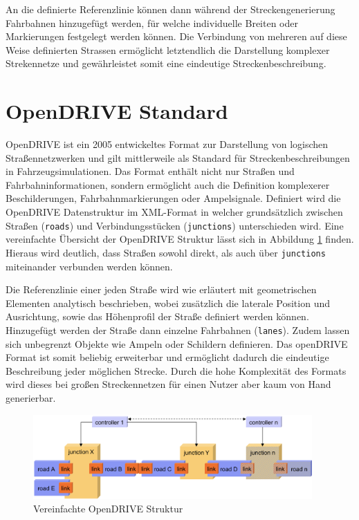 An die definierte Referenzlinie können dann während der Streckengenerierung Fahrbahnen hinzugefügt werden, für welche individuelle Breiten oder Markierungen festgelegt werden können. Die Verbindung von mehreren auf diese Weise definierten Strassen ermöglicht letztendlich die Darstellung komplexer Strekennetze und gewährleistet somit eine eindeutige Streckenbeschreibung. 

\section{OpenDRIVE Standard}

OpenDRIVE ist ein 2005 entwickeltes Format zur Darstellung von logischen Straßennetzwerken und gilt mittlerweile als Standard für Streckenbeschreibungen in Fahrzeugsimulationen. Das Format enthält nicht nur Straßen und Fahrbahninformationen, sondern ermöglicht auch die Definition komplexerer Beschilderungen, Fahrbahnmarkierungen oder Ampelsignale. \cite{OpenDRIVE.2019} Definiert wird die OpenDRIVE Datenstruktur im XML-Format in welcher grundsätzlich zwischen Straßen (\texttt{roads}) und Verbindungsstücken (\texttt{junctions}) unterschieden wird. Eine vereinfachte Übersicht der OpenDRIVE Struktur lässt sich in Abbildung \ref{abb3} finden. Hieraus wird deutlich, dass Straßen sowohl direkt, als auch über \texttt{junctions} miteinander verbunden werden können. 

Die Referenzlinie einer jeden Straße wird wie erläutert mit geometrischen Elementen analytisch beschrieben, wobei zusätzlich die laterale Position und Ausrichtung, sowie das Höhenprofil der Straße definiert werden können. Hinzugefügt werden der Straße dann einzelne Fahrbahnen (\texttt{lanes}). Zudem lassen sich unbegrenzt Objekte wie Ampeln oder Schildern definieren. \cite{OpenDRIVEDoku.2019} Das openDRIVE Format ist somit beliebig erweiterbar und ermöglicht dadurch die eindeutige Beschreibung jeder möglichen Strecke. Durch die hohe Komplexität des Formats wird dieses bei großen Streckennetzen für einen Nutzer aber kaum von Hand generierbar.

\begin{figure}[H]
\flushleft
\includegraphics[width=0.95\textwidth]{fig/fig3.png}
\caption{Vereinfachte OpenDRIVE Struktur \cite{Dupuis.2006}}
\label{abb3}
\end{figure}

